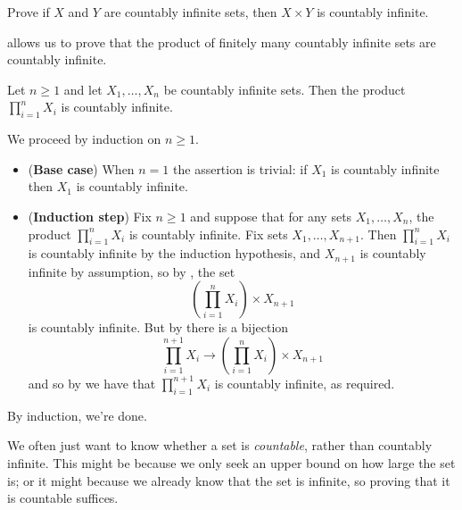 \begin{exercise}
Prove if $X$ and $Y$ are countably infinite sets, then $X \times Y$ is countably infinite.
\end{exercise}

 allows us to prove that the product of finitely many countably infinite sets are countably infinite.

\begin{proposition}
\label{propFiniteProductOfCountableSetsIsCountable}
Let $n \ge 1$ and let $X_1, \dots, X_n$ be countably infinite sets. Then the product $\displaystyle \prod_{i=1}^n X_i$ is countably infinite.
\end{proposition}
\begin{cproof}
We proceed by induction on $n \ge 1$.
\begin{itemize}
\item (\textbf{Base case}) When $n=1$ the assertion is trivial: if $X_1$ is countably infinite then $X_1$ is countably infinite.
\item (\textbf{Induction step}) Fix $n \ge 1$ and suppose that for any sets $X_1, \dots, X_n$, the product $\prod_{i=1}^n X_i$ is countably infinite. Fix sets $X_1, \dots, X_{n+1}$. Then $\prod_{i=1}^n X_i$ is countably infinite by the induction hypothesis, and $X_{n+1}$ is countably infinite by assumption, so by , the set
\[ \left( \prod_{i=1}^n X_i \right) \times X_{n+1} \]
is countably infinite. But by  there is a bijection 
\[ \prod_{i=1}^{n+1} X_i \to \left( \prod_{i=1}^n X_i \right) \times X_{n+1} \]
and so by  we have that $\prod_{i=1}^{n+1} X_i$ is countably infinite, as required.
\end{itemize}
By induction, we're done.
\end{cproof}

We often just want to know whether a set is \textit{countable}, rather than countably infinite. This might be because we only seek an upper bound on how large the set is; or it might because we already know that the set is infinite, so proving that it is countable suffices.

